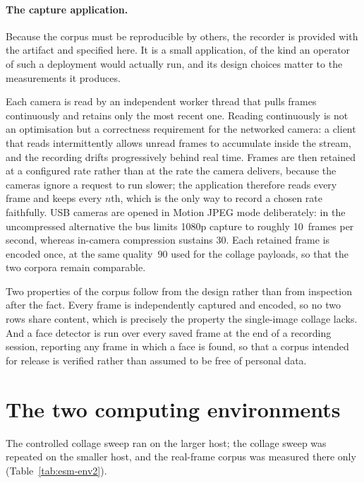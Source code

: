 \documentclass[11pt]{article}
\begin{document}
\paragraph{The capture application.} Because the corpus must be reproducible by others, the recorder is provided with the artifact and specified here. It is a small application, of the kind an operator of such a deployment would actually run, and its design choices matter to the measurements it produces.

Each camera is read by an independent worker thread that pulls frames continuously and retains only the most recent one. Reading continuously is not an optimisation but a correctness requirement for the networked camera: a client that reads intermittently allows unread frames to accumulate inside the stream, and the recording drifts progressively behind real time. Frames are then retained at a configured rate rather than at the rate the camera delivers, because the cameras ignore a request to run slower; the application therefore reads every frame and keeps every $n$th, which is the only way to record a chosen rate faithfully. USB cameras are opened in Motion JPEG mode deliberately: in the uncompressed alternative the bus limits 1080p capture to roughly 10~frames per second, whereas in-camera compression sustains 30. Each retained frame is encoded once, at the same quality~90 used for the collage payloads, so that the two corpora remain comparable.

Two properties of the corpus follow from the design rather than from inspection after the fact. Every frame is independently captured and encoded, so no two rows share content, which is precisely the property the single-image collage lacks. And a face detector is run over every saved frame at the end of a recording session, reporting any frame in which a face is found, so that a corpus intended for release is verified rather than assumed to be free of personal data.

\section{The two computing environments}\label{sec:esm-env}
The controlled collage sweep ran on the larger host; the collage sweep was repeated on the smaller host, and the real-frame corpus was measured there only (Table~\ref{tab:esm-env2}).
\end{document}
